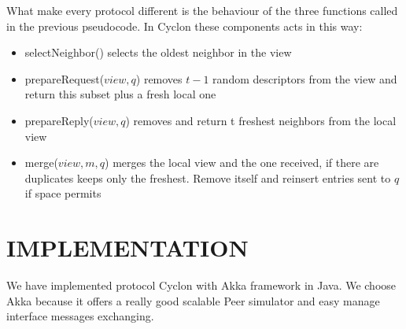 \documentclass[a4paper,12pt,notitlepage]{article} %
\begin{document}
\begin{algorithm}[H]
\SetAlgoLined
{}

\BlankLine
{}
\BlankLine

\BlankLine

\BlankLine
\end{algorithm}

What make every protocol different is the behaviour of
 the three functions called in the previous pseudocode. In Cyclon these components acts
 in this way:

\begin{itemize}
	\item selectNeighbor() selects the oldest neighbor in the view
	\item prepareRequest(\(view, q\)) removes \(t-1\) random descriptors from the view and return this 
	subset plus a fresh local one
	\item prepareReply(\(view, q\)) removes and return t freshest neighbors from the local view
	\item merge(\(view, m, q\)) merges the local view and the one received, if there are duplicates keeps only the 
	freshest. Remove itself and reinsert entries sent to \(q\) if space permits
\end{itemize}






\section{IMPLEMENTATION}

We have implemented protocol Cyclon with Akka framework in Java.
We choose Akka because it offers a really good scalable Peer simulator and easy manage interface messages exchanging.
\end{document}
